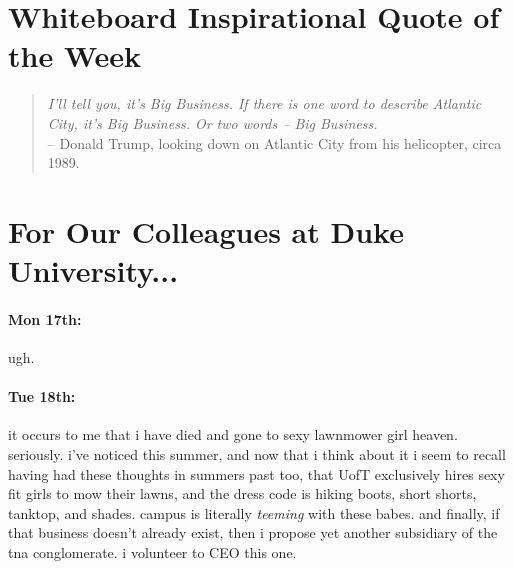\documentclass[12pt]{article}
\begin{document}
\newpage
{}
\section*{Whiteboard Inspirational Quote of the Week}
\begin{quote}
\textit{I'll tell you, it's Big Business. If there is one word to describe Atlantic City, it's Big Business. Or two words -- Big Business.} \\ -- Donald Trump, looking down on Atlantic City from his helicopter, circa 1989.
\end{quote}
\section*{For Our Colleagues at Duke University...}
\paragraph{Mon 17th:} ugh.
\paragraph{Tue 18th:} it occurs to me that i have died and gone to sexy lawnmower girl heaven. seriously. i've noticed this summer, and now that i think about it i seem to recall having had these thoughts in summers past too, that UofT exclusively hires sexy fit girls to mow their lawns, and the dress code is hiking boots, short shorts, tanktop, and shades. campus is literally \emph{teeming} with these babes. and finally, if that business doesn't already exist, then i propose yet another subsidiary of the tna conglomerate. i volunteer to CEO this one. 
\end{document}
